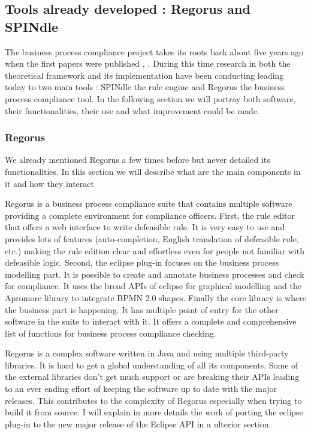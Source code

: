 \documentclass[10pt]{report}
\begin{document}
\subsection{Tools already developed : Regorus and SPINdle}

The business process compliance project takes its roots back about five years ago when the first papers were published \autocite{journeyToBPC}, \autocite{isf09compliance}. During this time research in both the theoretical framework and its implementation have been conducting leading today to two main tools : SPINdle the rule engine and Regorus the business process compliance tool. In the following section we will portray both software, their functionalities, their use and what improvement could be made.

\subsubsection{Regorus}
We already mentioned Regorus a few times before but never detailed its functionalities. In this section we will describe what are the main components in it and how they interact

Regorus is a business process compliance suite that contains multiple software providing a complete environment for compliance officers. First, the rule editor that offers a web interface to write defeasible rule. It is very easy to use and provides lots of features (auto-completion, English translation of defeasible rule, etc.) making the rule edition clear and effortless even for people not familiar with defeasible logic. Second, the eclipse plug-in focuses on the business process modelling part. It is possible to create and annotate business processes and check for compliance. It uses the broad APIs of eclipse for graphical modelling and the Apromore library to integrate BPMN 2.0 shapes. Finally the core library is where the business part is happening. It has multiple point of entry for the other software in the suite to interact with it. It offers a complete and comprehensive list of functions for business process compliance checking.

Regorus is a complex software written in Java and using multiple third-party libraries. It is hard to get a global understanding of all its components. Some of the external libraries don't get much support or are breaking their APIs leading to an ever ending effort of keeping the software up to date with the major releases. This contributes to the complexity of Regorus especially when trying to build it from source. I will explain in more details the work of porting the eclipse plug-in to the new major release of the Eclipse API in a ulterior section.
\end{document}
